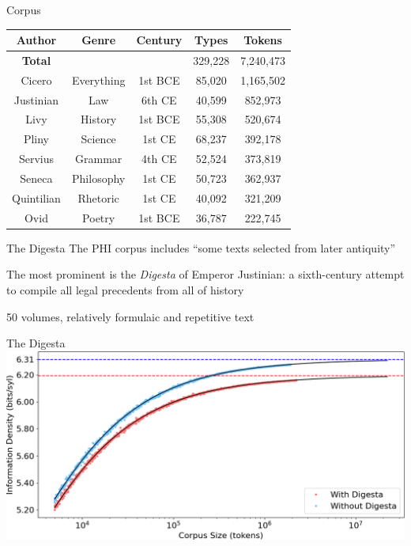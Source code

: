 \documentclass{beamer}
\begin{document}
\begin{frame}{Corpus}
\begin{table}
\begin{tabular}{|c|c|c|c|c|}
\hline
\textbf{Author} & \textbf{Genre} & \textbf{Century} & \textbf{Types} & \textbf{Tokens} \\\hline
\textbf{Total} & & & 329,228 & 7,240,473 \\\hline\hline
\rowcolor{yellow} Cicero & Everything & 1st BCE & 85,020 & 1,165,502 \\\hline
\rowcolor{yellow} Justinian & Law & 6th CE & 40,599 & 852,973 \\\hline
Livy & History & 1st BCE & 55,308 & 520,674 \\\hline
Pliny & Science & 1st CE & 68,237 & 392,178 \\\hline
Servius & Grammar & 4th CE & 52,524 & 373,819 \\\hline
Seneca & Philosophy & 1st CE & 50,723 & 362,937 \\\hline
Quintilian & Rhetoric & 1st CE & 40,092 & 321,209 \\\hline
Ovid & Poetry & 1st BCE & 36,787 & 222,745 \\\hline
\end{tabular}
\end{table}
\end{frame}

\begin{frame}{The Digesta}
The PHI corpus includes ``some texts selected from later antiquity''

The most prominent is the \emph{Digesta} of Emperor Justinian: a sixth-century attempt to compile all legal precedents from all of history

50 volumes, relatively formulaic and repetitive text
\end{frame}

\begin{frame}{The Digesta}
\includegraphics[width=\linewidth]{digesta}
\end{frame}
\end{document}
